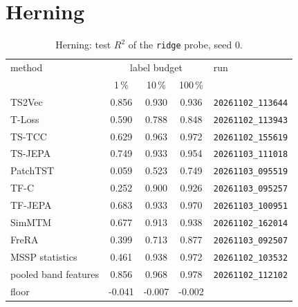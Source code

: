 \section{Herning}
\begin{table}[h]
\centering
\begin{tabular}{lcccl}
\toprule
method & \multicolumn{3}{c}{label budget} & run \\
 & 1\,\% & 10\,\% & 100\,\% & \\
\midrule
TS2Vec & 0.856 & 0.930 & 0.936 & \texttt{\footnotesize 20261102\_113644} \\
T-Loss & 0.590 & 0.788 & 0.848 & \texttt{\footnotesize 20261102\_113943} \\
TS-TCC & 0.629 & 0.963 & 0.972 & \texttt{\footnotesize 20261102\_155619} \\
TS-JEPA & 0.749 & 0.933 & 0.954 & \texttt{\footnotesize 20261103\_111018} \\
PatchTST & 0.059 & 0.523 & 0.749 & \texttt{\footnotesize 20261103\_095519} \\
TF-C & 0.252 & 0.900 & 0.926 & \texttt{\footnotesize 20261103\_095257} \\
TF-JEPA & 0.683 & 0.933 & 0.970 & \texttt{\footnotesize 20261103\_100951} \\
SimMTM & 0.677 & 0.913 & 0.938 & \texttt{\footnotesize 20261102\_162014} \\
FreRA & 0.399 & 0.713 & 0.877 & \texttt{\footnotesize 20261103\_092507} \\
\midrule
MSSP statistics & 0.461 & 0.938 & 0.972 & \texttt{\footnotesize 20261102\_103532} \\
pooled band features & 0.856 & 0.968 & 0.978 & \texttt{\footnotesize 20261102\_112102} \\
\midrule
floor & -0.041 & -0.007 & -0.002 & \\
\bottomrule
\end{tabular}
\caption{Herning: test $R^2$ of the \texttt{ridge} probe, seed 0.}
\end{table}


